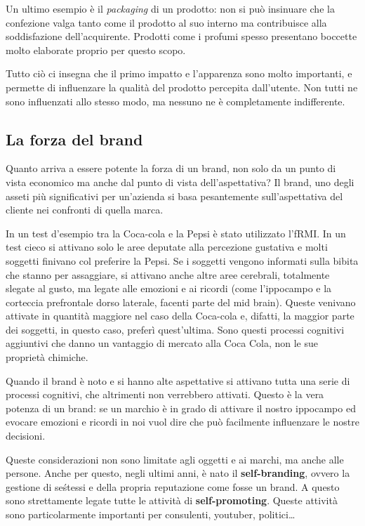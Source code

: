 Un ultimo esempio è il \emph{packaging} di un prodotto: non si può insinuare
che la confezione valga tanto come il prodotto al suo interno ma contribuisce
alla soddisfazione dell'acquirente. Prodotti come i profumi spesso presentano
boccette molto elaborate proprio per questo scopo.

Tutto ciò ci insegna che il primo impatto e l'apparenza sono molto importanti,
e permette di influenzare la qualità del prodotto percepita dall'utente. Non
tutti ne sono influenzati allo stesso modo, ma nessuno ne è completamente
indifferente.

\subsection{La forza del brand}

Quanto arriva a essere potente la forza di un brand, non solo da un punto di
vista economico ma anche dal punto di vista dell'aspettativa?
Il brand, uno degli asseti più significativi per un'azienda si basa
pesantemente sull'aspettativa del cliente nei confronti di quella marca.

In un test d'esempio tra la Coca-cola e la Pepsi è stato utilizzato l'fRMI. In
un test cieco si attivano solo le aree deputate alla percezione gustativa e
molti soggetti finivano col preferire la Pepsi. Se i soggetti vengono
informati sulla bibita che stanno per assaggiare, si attivano anche altre
aree cerebrali, totalmente slegate al gusto, ma legate alle emozioni e ai
ricordi (come l'ippocampo e la corteccia prefrontale dorso laterale, facenti
parte del mid brain). Queste venivano attivate in quantità maggiore nel caso
della Coca-cola e, difatti, la maggior parte dei soggetti, in questo caso,
preferì quest'ultima. Sono questi processi cognitivi aggiuntivi che danno un
vantaggio di mercato alla Coca Cola, non le sue proprietà chimiche.

Quando il brand è noto e si hanno alte aspettative si attivano tutta una serie
di processi cognitivi, che altrimenti non verrebbero attivati. Questo è la vera
potenza di un brand: se un marchio è in grado di attivare il nostro ippocampo
ed evocare emozioni e ricordi in noi vuol dire che può facilmente influenzare
le nostre decisioni.

Queste considerazioni non sono limitate agli oggetti e ai marchi, ma anche alle
persone. Anche per questo, negli ultimi anni, è nato il \textbf{self-branding},
ovvero la gestione di se\' stessi e della propria reputazione come fosse un
brand. A questo sono strettamente legate tutte le attività di
\textbf{self-promoting}. Queste attività
sono particolarmente importanti per consulenti, youtuber, politici\dots{}

